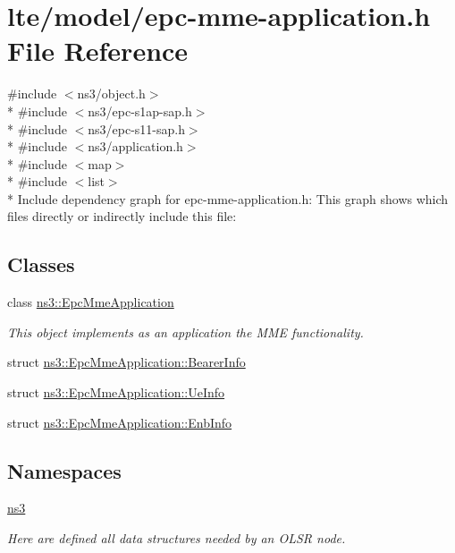 \hypertarget{epc-mme-application_8h}{}\section{lte/model/epc-\/mme-\/application.h File Reference}
\label{epc-mme-application_8h}
{\ttfamily \#include $<$ns3/object.\+h$>$}\\*
{\ttfamily \#include $<$ns3/epc-\/s1ap-\/sap.\+h$>$}\\*
{\ttfamily \#include $<$ns3/epc-\/s11-\/sap.\+h$>$}\\*
{\ttfamily \#include $<$ns3/application.\+h$>$}\\*
{\ttfamily \#include $<$map$>$}\\*
{\ttfamily \#include $<$list$>$}\\*
Include dependency graph for epc-\/mme-\/application.h\+:
This graph shows which files directly or indirectly include this file\+:
\subsection*{Classes}
\begin{DoxyCompactItemize}
\item 
class \hyperlink{classns3_1_1EpcMmeApplication}{ns3\+::\+Epc\+Mme\+Application}
\begin{DoxyCompactList}\small\item\em This object implements as an application the M\+ME functionality. \end{DoxyCompactList}\item 
struct \hyperlink{structns3_1_1EpcMmeApplication_1_1BearerInfo}{ns3\+::\+Epc\+Mme\+Application\+::\+Bearer\+Info}
\item 
struct \hyperlink{structns3_1_1EpcMmeApplication_1_1UeInfo}{ns3\+::\+Epc\+Mme\+Application\+::\+Ue\+Info}
\item 
struct \hyperlink{structns3_1_1EpcMmeApplication_1_1EnbInfo}{ns3\+::\+Epc\+Mme\+Application\+::\+Enb\+Info}
\end{DoxyCompactItemize}
\subsection*{Namespaces}
\begin{DoxyCompactItemize}
\item 
 \hyperlink{namespacens3}{ns3}
\begin{DoxyCompactList}\small\item\em Here are defined all data structures needed by an O\+L\+SR node. \end{DoxyCompactList}\end{DoxyCompactItemize}
